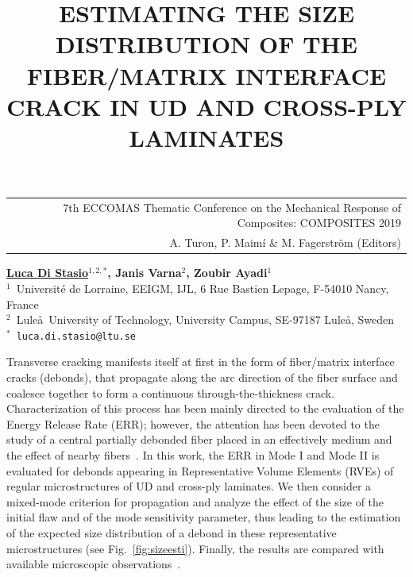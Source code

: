 \documentclass[12pt,a4paper]{article}
\begin{document}
\thispagestyle{empty}

\vspace*{-3.4cm}
\begin{table}[!h]
\begin{tabular}{r}
\hspace*{2.9cm} \scriptsize \textsf{7th ECCOMAS Thematic Conference on the Mechanical Response of Composites: COMPOSITES 2019} \\
\hspace*{2.9cm} \tiny \textsf{A. Turon, P. Maimí \& M. Fagerström (Editors)}
\end{tabular}
\end{table}

\vspace*{-0.7cm}

\begin{center}
\title{ESTIMATING THE SIZE DISTRIBUTION OF THE FIBER/MATRIX INTERFACE CRACK IN UD AND CROSS-PLY LAMINATES}
\end{center}
\begin{center}
\textbf{\underline{Luca Di Stasio}$^{1,2,*}$, Janis Varna$^{2}$, Zoubir Ayadi$^{1}$} \\ [7pt]
\small{$^1$~Universit\'e de Lorraine, EEIGM, IJL, 6 Rue Bastien Lepage, F-54010 Nancy, France}  \\  [2pt]
\small{$^2$~Lule\aa\ University of Technology, University Campus, SE-97187 Lule\aa, Sweden}  \\  [2pt]
\small{$^*$~\texttt{luca.di.stasio@ltu.se}} \\
\end{center}

\noindent
Transverse cracking manifests itself at first in the form of fiber/matrix interface cracks (debonds), that propagate along the arc direction of the fiber surface and coalesce together to form a continuous through-the-thickness crack. Characterization of this process has been mainly directed to the evaluation of the Energy Release Rate (ERR); however, the attention has been devoted to the study of a central partially debonded fiber placed in an effectively medium and the effect of nearby fibers~\cite{Sandino2016}. In this work, the ERR in Mode I and Mode II is evaluated for debonds appearing in Representative Volume Elements (RVEs) of regular microstructures of UD and cross-ply laminates. We then consider a mixed-mode criterion for propagation and analyze the effect of the size of the initial flaw and of the mode sensitivity parameter, thus leading to the estimation of the expected size distribution of a debond in these representative microstructures (see Fig.~\ref{fig:sizeesti}). Finally, the results are compared with available microscopic observations~\cite{Correa2018}.
\end{document}
